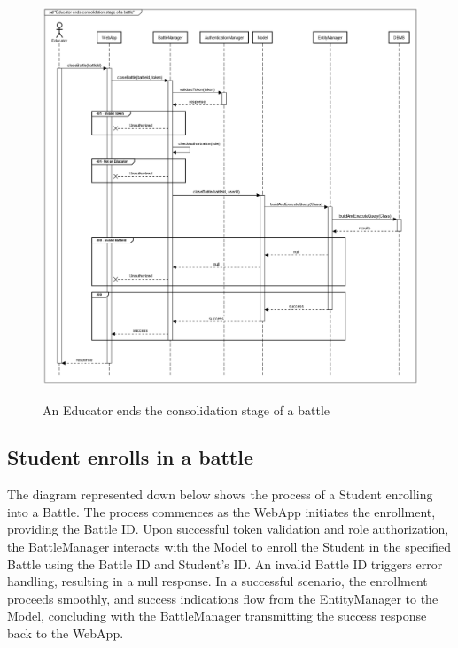 \documentclass{Configuration_Files/Template}
\begin{document}
\begin{figure}[H]
\centering
\includegraphics[scale = 0.33]{Images/diagrams/sequences/endBattle.png}\\
\caption{An Educator ends the consolidation stage of a battle}
\end{figure}

\subsection*{Student enrolls in a battle}

The diagram represented down below shows the process of a Student enrolling into a Battle. The process commences as the WebApp initiates the enrollment, providing the Battle ID. Upon successful token validation and role authorization, the BattleManager interacts with the Model to enroll the Student in the specified Battle using the Battle ID and Student's ID. An invalid Battle ID triggers error handling, resulting in a null response. In a successful scenario, the enrollment proceeds smoothly, and success indications flow from the EntityManager to the Model, concluding with the BattleManager transmitting the success response back to the WebApp.
\end{document}
